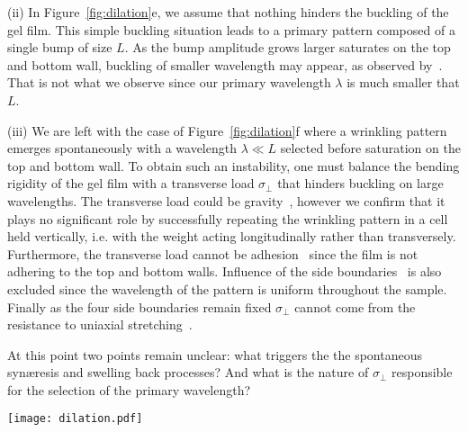 \documentclass[twocolumn,superscriptaddress,showpacs,preprintnumbers,
amsmath,amssymb,prl]{revtex4-1}
\begin{document}
\noindent
(ii) In Figure~\ref{fig:dilation}e, we assume that nothing hinders the buckling of the gel film. This simple buckling situation leads to a primary pattern composed of a single bump of size $L$. As the bump amplitude grows larger saturates on the top and bottom wall, buckling of smaller wavelength may appear, as observed by~\cite{Roman1999}. That is not what we observe since our primary wavelength $\lambda$ is much smaller that $L$.

\noindent
(iii) We are left with the case of Figure~\ref{fig:dilation}f where a wrinkling pattern emerges spontaneously with a wavelength $\lambda\ll L$ selected before saturation on the top and bottom wall. To obtain such an instability, one must balance the bending rigidity of the gel film with a transverse load $\sigma_{\perp}$ that hinders buckling on large wavelengths. The transverse load could be gravity~\cite{Smoluchowski1910, Kolinski2009, Vella2009, Pineirua2013, Lucantonio2013}, however we confirm that it plays no significant role by successfully repeating the wrinkling pattern in a cell held vertically, i.e. with the weight acting longitudinally rather than transversely. Furthermore, the transverse load cannot be adhesion~\cite{Vella2009a} since the film is not adhering to the top and bottom walls. Influence of the side boundaries~\cite{Vandeparre2011a, Li2013} is also excluded since the wavelength of the pattern is uniform throughout the sample. Finally as the four side boundaries remain fixed $\sigma_{\perp}$ cannot come from the resistance to uniaxial stretching~\cite{Cerda2003}.

At this point two points remain unclear: what triggers the the spontaneous syn\ae{}resis and swelling back processes? And what is the nature of $\sigma_{\perp}$ responsible for the selection of the primary wavelength?

\begin{figure*}
\texttt{[image: dilation.pdf]}
\caption{The wrinkling experiment. (a) Initial configuration where the sealed cell contains an homogeneous protein solution. (b) Around the isoelectric pH, the gel forms and immediately expels solvent leading to (c). If tensile stresses were not released we would observe reversible swelling back leading to (d) a flat swollen gel layer. If tensile stresses are released, swelling back leads either to buckling (e) or to wrinkling (f) depending whether the bending is free or hindered by a transverse load.}
\label{fig:dilation}
\end{figure*}
\end{document}

